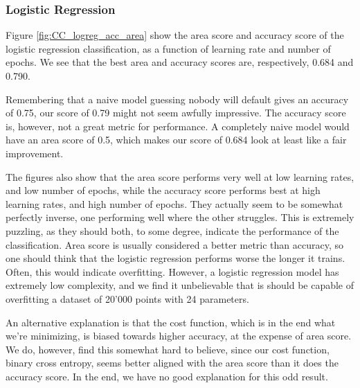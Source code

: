 \documentclass[10pt, twocolumn]{article}
\begin{document}
\subsubsection{Logistic Regression}
Figure \ref{fig:CC_logreg_acc_area} show the area score and accuracy score of the logistic regression classification, as a function of learning rate and number of epochs. We see that the best area and accuracy scores are, respectively, 0.684 and 0.790.

Remembering that a naive model guessing nobody will default gives an accuracy of 0.75, our score of 0.79 might not seem awfully impressive. The accuracy score is, however, not a great metric for performance. A completely naive model would have an area score of 0.5, which makes our score of 0.684 look at least like a fair improvement.

The figures also show that the area score performs very well at low learning rates, and low number of epochs, while the accuracy score performs best at high learning rates, and high number of epochs. They actually seem to be somewhat perfectly inverse, one performing well where the other struggles. This is extremely puzzling, as they should both, to some degree, indicate the performance of the classification. Area score is usually considered a better metric than accuracy, so one should think that the logistic regression performs worse the longer it trains. Often, this would indicate overfitting. However, a logistic regression model has extremely low complexity, and we find it unbelievable that is should be capable of overfitting a dataset of 20'000 points with 24 parameters.

An alternative explanation is that the cost function, which is in the end what we're minimizing, is biased towards higher accuracy, at the expense of area score. We do, however, find this somewhat hard to believe, since our cost function, binary cross entropy, seems better aligned with the area score than it does the accuracy score. In the end, we have no good explanation for this odd result.
\end{document}
